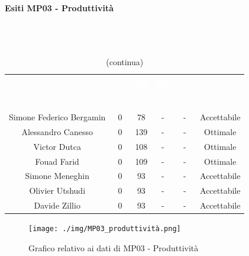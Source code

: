 \paragraph{Esiti MP03 - Produttività} \mbox{} \\ \mbox{} \\
\begin{longtable}{c c c c c c}
\rowcolor{white}\caption{Esiti della Produttività} \\
		\rowcolor{redafk}
\textcolor{white}{\textbf{Membro}} &
\textcolor{white}{\textbf{An}} &
\textcolor{white}{\textbf{TB}} &
\textcolor{white}{\textbf{PB}} &
\textcolor{white}{\textbf{VC}} &
\textcolor{white}{\textbf{Riscontro}} \\
		\endfirsthead
		\rowcolor{white}\caption[]{(continua)} \\
		\rowcolor{redafk}
		\textcolor{white}{\textbf{Membro}} &
\textcolor{white}{\textbf{An}} &
\textcolor{white}{\textbf{TB}} &
\textcolor{white}{\textbf{PB}} &
\textcolor{white}{\textbf{VC}} &
\textcolor{white}{\textbf{Riscontro}} \\
		\endhead
Simone Federico Bergamin & 0 & 78 & - & - & Accettabile\\
Alessandro Canesso & 0 & 139 & - & - & Ottimale \\
Victor Dutca & 0 & 108 & - & - & Ottimale \\
Fouad Farid & 0 & 109 & - & - & Ottimale \\
Simone Meneghin & 0 & 93 & - & - & Accettabile\\
Olivier Utshudi & 0 & 93 & - & - & Accettabile\\
Davide Zillio & 0 & 93 & - & - & Accettabile

\end{longtable}


\begin{figure}[H]
\centering
\texttt{[image: ./img/MP03\_produttività.png]}
\caption{Grafico relativo ai dati di MP03 - Produttività}
\end{figure}